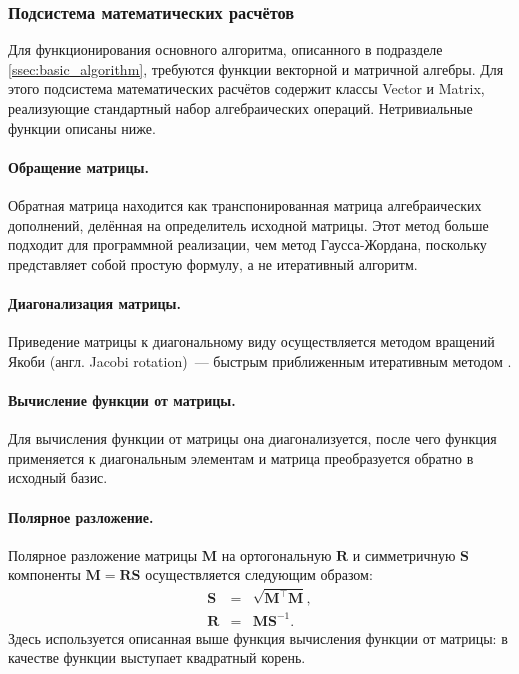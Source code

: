 \documentclass[a4paper, 14pt, titlepage]{extarticle}
\newcommand{\eng}[1]{{\English #1}}
\newcommand{\matx}[1]{\mathbf{#1}} %
\newcommand{\transposed}{\top} %
\begin{document}
      \subsubsection{Подсистема математических расчётов}\label{sssec:math}

        Для функционирования основного алгоритма, описанного в подразделе \ref{ssec:basic_algorithm}, требуются
        функции векторной и матричной алгебры. Для этого подсистема математических расчётов содержит
        классы Vector и Matrix, реализующие стандартный набор алгебраических операций. Нетривиальные
        функции описаны ниже.

        \paragraph{Обращение матрицы.}
        Обратная матрица находится как транспонированная матрица алгебраических дополнений, делённая
        на определитель исходной матрицы. Этот метод больше подходит для программной реализации, чем
        метод Гаусса-Жордана, поскольку представляет собой простую формулу, а не итеративный
        алгоритм.

        \paragraph{Диагонализация матрицы.}
        Приведение матрицы к диагональному виду осуществляется методом вращений Якоби (англ.
        \eng{Jacobi rotation})~--- быстрым приближенным итеративным методом \cite{fortran-jacobi}.

        \paragraph{Вычисление функции от матрицы.}
        Для вычисления функции от матрицы она диагонализуется, после чего функция применяется к
        диагональным элементам и матрица преобразуется обратно в исходный базис.

        \paragraph{Полярное разложение.}
        Полярное разложение матрицы $\matx M$ на ортогональную $\matx R$ и симметричную $\matx S$ компоненты
        $\matx M = \matx R \matx S$ осуществляется следующим образом:
        \begin{eqnarray*}
          \matx S & = & \sqrt{\matx{M}^\transposed \matx{M}},\\
          \matx R & = & \matx M \matx{S}^{-1}.
        \end{eqnarray*}
        Здесь используется описанная выше функция вычисления функции от матрицы: в качестве функции
        выступает квадратный корень.
\end{document}
